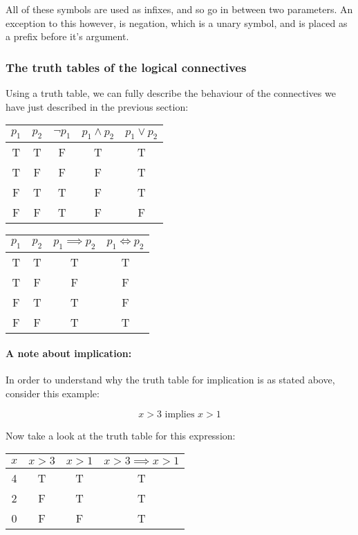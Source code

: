 All of these symbols are used as infixes, and so go in between two parameters.
An exception to this however, is negation, which is a unary symbol, and is
placed as a prefix before it's argument.


\subsubsection{The truth tables of the logical connectives}

Using a truth table, we can fully describe the behaviour of the connectives we
have just described in the previous section:

\begin{center}
	\begin{tabular}{|c|c|c|c|c|}
		\hline
		$p_1$& $p_2$& $\neg p_1$& $p_1 \wedge p_2$& $p_1 \vee p_2$\\ \hline
		T& T& F& T &T\\
		T& F& F& F &T\\
		F& T& T& F &T\\
		F& F& T& F &F\\ \hline
	\end{tabular}
	\begin{tabular}{|c|c|c|c|}
		\hline
		$p_1$& $p_2$& $p_1 \implies p_2$& $p_1 \iff p_2$\\ \hline
		T& T& T &T\\
		T& F& F &F\\
		F& T& T &F\\
		F& F& T &T\\ \hline
	\end{tabular}
\end{center}

\paragraph{A note about implication:}
In order to understand why the truth table for implication is as stated above,
consider this example:

\begin{dmath}
	{x > 3 \textrm{ implies } x > 1}
\end{dmath}

Now take a look at the truth table for this expression:

\begin{center}
	\begin{tabular}{|c|c|c|c|}
		\hline
		$x$ & $x > 3$ & $x > 1$ & $x > 3 \implies x > 1$\\ \hline
		4 & T & T & T\\
		2 & F & T & T\\
		0 & F & F & T\\ \hline
	\end{tabular}
\end{center}

